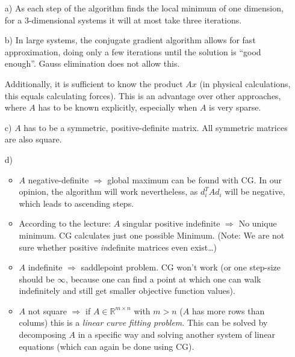 \documentclass[10pt,DIV10,a4paper]{scrartcl}
\begin{document}
\begin{itemize}
    \item[a)] As each step of the algorithm finds the local minimum of one dimension, for a 3-dimensional systems it will at most take three iterations.
    \item[b)] In large systems, the conjugate gradient algorithm allows for fast approximation, doing only a few iterations until the solution is “good enough”. Gauss elimination does not allow this.

        Additionally, it is sufficient to know the product $Ax$ (in physical calculations, this equals calculating forces). This is an advantage over other approaches, where $A$ has to be known explicitly, especially when $A$ is very sparse.
    \item[c)] $A$ has to be a symmetric, positive-definite matrix. All symmetric matrices are also square.
    \item[d)] 
    \begin{itemize}
    \item $A$ negative-definite $\Rightarrow$ global maximum can be found with CG. In our opinion, the algorithm will work nevertheless, as $d_i^TAd_i$ will be negative, which leads to ascending steps.
    \item According to the lecture: $A$ singular positive indefinite $\Rightarrow$ No unique minimum. CG calculates just one possible Minimum. (Note: We are not sure whether positive {\em in}definite matrices even exist\dots)
    \item $A$ indefinite $\Rightarrow$ saddlepoint problem. CG won't work (or one step-size should be $\infty$, because one can find a point at which one can walk indefinitely and still get smaller objective function values).
    \item $A$ not square $\Rightarrow$ if $A \in \mathbb{R}^{m\times n}$ with $m > n$ ($A$ has more rows than colums) this is a {\em linear curve fitting problem}. This can be solved by decomposing $A$ in a specific way and solving another system of linear equations (which can again be done using CG).
    \end{itemize}
\end{itemize}
\end{document}
